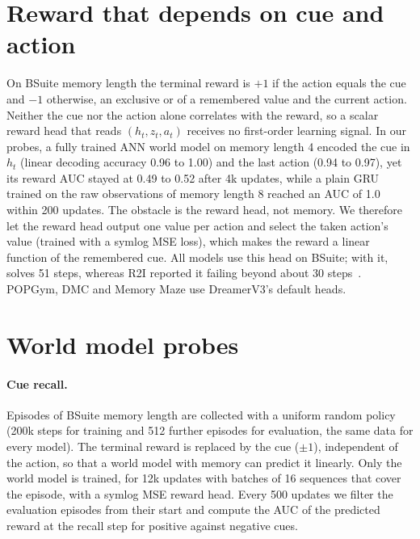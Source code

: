 \begin{table}[t]
  \centering\tabfont
  \caption{\textbf{DMC from proprioception}: return after 500k environment steps, mean of the last three evaluations. : in progress.}
  \label{tab:dmc}
  
\end{table}

\section{Reward that depends on cue and action}
\label{supp:reward}

On BSuite memory length the terminal reward is $+1$ if the action equals the cue and $-1$ otherwise, an exclusive or of a remembered value and the current action.
Neither the cue nor the action alone correlates with the reward, so a scalar reward head that reads $(h_t, z_t, a_t)$ receives no first-order learning signal.
In our probes, a fully trained ANN world model on memory length 4 encoded the cue in $h_t$ (linear decoding accuracy 0.96 to 1.00) and the last action (0.94 to 0.97), yet its reward AUC stayed at 0.49 to 0.52 after 4k updates, while a plain GRU trained on the raw observations of memory length 8 reached an AUC of 1.0 within 200 updates.
The obstacle is the reward head, not memory.
We therefore let the reward head output one value per action and select the taken action's value (trained with a symlog MSE loss), which makes the reward a linear function of the remembered cue.
All models use this head on BSuite; with it, \dv solves 51 steps, whereas R2I reported it failing beyond about 30 steps~\cite{samsami2024r2i}.
POPGym, DMC and Memory Maze use DreamerV3's default heads.

\section{World model probes}
\label{supp:probe}

\paragraph{Cue recall.}
Episodes of BSuite memory length are collected with a uniform random policy (200k steps for training and 512 further episodes for evaluation, the same data for every model).
The terminal reward is replaced by the cue ($\pm1$), independent of the action, so that a world model with memory can predict it linearly.
Only the world model is trained, for 12k updates with batches of 16 sequences that cover the episode, with a symlog MSE reward head.
Every 500 updates we filter the evaluation episodes from their start and compute the AUC of the predicted reward at the recall step for positive against negative cues.

